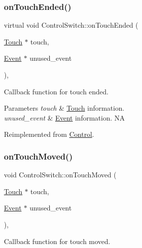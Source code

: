 \subsubsection{\texorpdfstring{on\+Touch\+Ended()}{onTouchEnded()}\hspace{0.1cm}{\footnotesize\ttfamily [2/2]}}
{\footnotesize\ttfamily virtual void Control\+Switch\+::on\+Touch\+Ended (\begin{DoxyParamCaption}\item[{\hyperlink{classTouch}{Touch} $\ast$}]{touch,  }\item[{\hyperlink{classEvent}{Event} $\ast$}]{unused\+\_\+event }\end{DoxyParamCaption})\hspace{0.3cm}{\ttfamily [override]}, {\ttfamily [virtual]}}

Callback function for touch ended.


\begin{DoxyParams}{Parameters}
{\em touch} & \hyperlink{classTouch}{Touch} information. \\
\hline
{\em unused\+\_\+event} & \hyperlink{classEvent}{Event} information.  NA \\
\hline
\end{DoxyParams}


Reimplemented from \hyperlink{classControl_a56073e57060169fe80cbb6ce1f4abe28}{Control}.

\mbox{\label{classControlSwitch_a74e7f363deee0b399be486f668dad631}} 
\subsubsection{\texorpdfstring{on\+Touch\+Moved()}{onTouchMoved()}\hspace{0.1cm}{\footnotesize\ttfamily [1/2]}}
{\footnotesize\ttfamily void Control\+Switch\+::on\+Touch\+Moved (\begin{DoxyParamCaption}\item[{\hyperlink{classTouch}{Touch} $\ast$}]{touch,  }\item[{\hyperlink{classEvent}{Event} $\ast$}]{unused\+\_\+event }\end{DoxyParamCaption})\hspace{0.3cm}{\ttfamily [override]}, {\ttfamily [virtual]}}

Callback function for touch moved.


